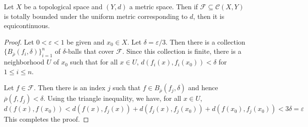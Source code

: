 \begin{theorem}
    Let $X$ be a topological space and $(Y,d)$ a metric space. Then if $\mathcal F\subseteq\mathcal C(X,Y)$ is totally bounded under the uniform metric corresponding to $d$, then it is equicontinuous.
\end{theorem}
\begin{proof}
    Let $0 < \varepsilon < 1$ be given and $x_0\in X$. Let $\delta = \varepsilon/3$. Then there is a collection $\{B_{\overline\rho}(f_i, \delta)\}_{i = 1}^n$ of $\delta$-balls that cover $\mathcal F$. Since this collection is finite, there is a neighborhood $U$ of $x_0$ such that for all $x\in U$, $d(f_i(x), f_i(x_0)) < \delta$ for $1\le i\le n$. 

    Let $f\in\mathcal F$. Then there is an index $j$ such that $f\in B_{\overline\rho}(f_j,\delta)$ and hence $\overline\rho(f,f_j) < \delta$. Using the triangle inequality, we have, for all $x\in U$, 
    \begin{equation*}
        d(f(x), f(x_0)) < d(f(x), f_j(x)) + d(f_j(x), f_j(x_0)) + d(f(x_0), f_j(x_0)) < 3\delta = \varepsilon
    \end{equation*}
    This completes the proof.
\end{proof}

